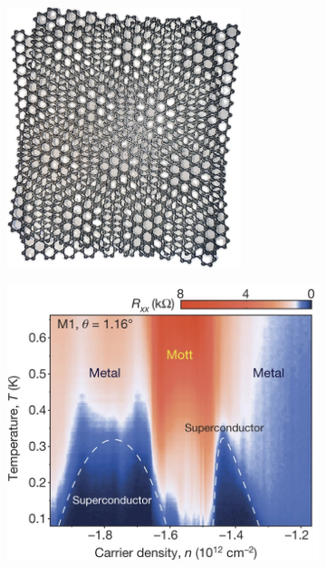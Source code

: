 \documentclass[../notes.tex]{subfiles}
\begin{document}
\begin{figure}
	\begin{subfigure}[b]{0.5\textwidth}
		\centering
		\caption{\hfill\null}\label{sfig:3D printed twisted graphene}
		\includegraphics[width=0.75\textwidth]{images/Twisted 3D printed graphene small.png}
	\end{subfigure}%
	\begin{subfigure}[b]{0.5\textwidth}
		\centering
		\caption{\hfill\null}\label{sfig:unconventional SC MATBG}
		\includegraphics[width=1.0\textwidth]{images/cao_unvoncentional_SC_MATBG.png}

\end{subfigure}
\end{figure}
\end{document}

